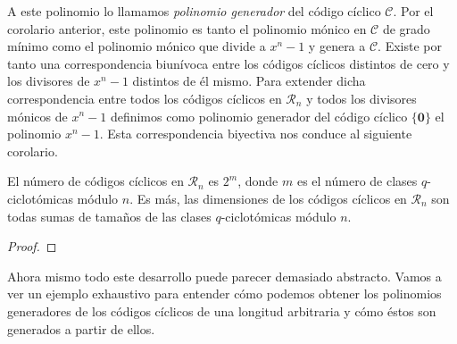 A este polinomio lo llamamos \textit{polinomio generador} del código cíclico \(\mathcal C\).
Por el corolario anterior, este polinomio es tanto el polinomio mónico en \(\mathcal C\) de grado mínimo como el polinomio mónico que divide a \(x^n - 1\) y genera a \(\mathcal C\).
Existe por tanto una correspondencia biunívoca entre los códigos cíclicos distintos de cero y los divisores de \(x^n - 1\) distintos de él mismo.
Para extender dicha correspondencia entre todos los códigos cíclicos en \(\mathcal R_n\) y todos los divisores mónicos de \(x^n - 1\) definimos como polinomio generador del código cíclico \(\{\mathbf 0\}\) el polinomio \(x^n - 1\). 
Esta correspondencia biyectiva nos conduce al siguiente corolario.

\begin{corollary}
  El número de códigos cíclicos en \(\mathcal R_n\) es \(2^m\), donde \(m\) es el número de clases \(q\)-ciclotómicas módulo \(n\).
  Es más, las dimensiones de los códigos cíclicos en \(\mathcal R_n\) son todas sumas de tamaños de las clases \(q\)-ciclotómicas módulo \(n\).
\end{corollary}

\begin{proof}
\end{proof}

Ahora mismo todo este desarrollo puede parecer demasiado abstracto.
Vamos a ver un ejemplo exhaustivo para entender cómo podemos obtener los polinomios generadores de los códigos cíclicos de una longitud arbitraria y cómo éstos son generados a partir de ellos.

